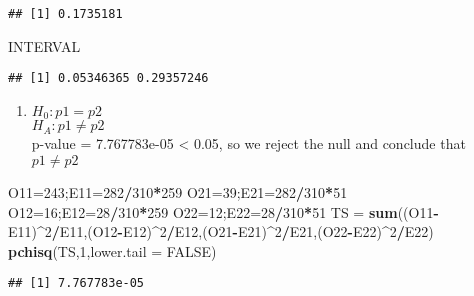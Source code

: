 \documentclass[]{article}
\newenvironment{Shaded}{\begin{snugshade}}{\end{snugshade}}
\newcommand{\KeywordTok}[1]{\textcolor[rgb]{0.13,0.29,0.53}{\textbf{#1}}}
\newcommand{\DataTypeTok}[1]{\textcolor[rgb]{0.13,0.29,0.53}{#1}}
\newcommand{\DecValTok}[1]{\textcolor[rgb]{0.00,0.00,0.81}{#1}}
\newcommand{\StringTok}[1]{\textcolor[rgb]{0.31,0.60,0.02}{#1}}
\newcommand{\OtherTok}[1]{\textcolor[rgb]{0.56,0.35,0.01}{#1}}
\newcommand{\OperatorTok}[1]{\textcolor[rgb]{0.81,0.36,0.00}{\textbf{#1}}}
\newcommand{\NormalTok}[1]{#1}
\providecommand{\tightlist}{%
  \setlength{\itemsep}{0pt}\setlength{\parskip}{0pt}}
\begin{document}
\begin{verbatim}
## [1] 0.1735181
\end{verbatim}

\begin{Shaded}
\begin{Highlighting}[]
\NormalTok{INTERVAL}
\end{Highlighting}
\end{Shaded}

\begin{verbatim}
## [1] 0.05346365 0.29357246
\end{verbatim}

\begin{enumerate}
\def\labelenumi{\alph{enumi}.}
\setcounter{enumi}{3}
\tightlist
\item
  \(H_0 : p1 = p2\)\\
  \(H_A : p1\neq p2\)\\
  p-value = 7.767783e-05 \textless{} 0.05, so we reject the null and
  conclude that \(p1\neq p2\)
\end{enumerate}

\begin{Shaded}
\begin{Highlighting}[]
\NormalTok{O11=}\DecValTok{243}\NormalTok{;E11=}\DecValTok{282}\OperatorTok{/}\DecValTok{310}\OperatorTok{*}\DecValTok{259}
\NormalTok{O21=}\DecValTok{39}\NormalTok{;E21=}\DecValTok{282}\OperatorTok{/}\DecValTok{310}\OperatorTok{*}\DecValTok{51}
\NormalTok{O12=}\DecValTok{16}\NormalTok{;E12=}\DecValTok{28}\OperatorTok{/}\DecValTok{310}\OperatorTok{*}\DecValTok{259}
\NormalTok{O22=}\DecValTok{12}\NormalTok{;E22=}\DecValTok{28}\OperatorTok{/}\DecValTok{310}\OperatorTok{*}\DecValTok{51}
\NormalTok{TS =}\StringTok{ }\KeywordTok{sum}\NormalTok{((O11}\OperatorTok{-}\NormalTok{E11)}\OperatorTok{^}\DecValTok{2}\OperatorTok{/}\NormalTok{E11,(O12}\OperatorTok{-}\NormalTok{E12)}\OperatorTok{^}\DecValTok{2}\OperatorTok{/}\NormalTok{E12,(O21}\OperatorTok{-}\NormalTok{E21)}\OperatorTok{^}\DecValTok{2}\OperatorTok{/}\NormalTok{E21,(O22}\OperatorTok{-}\NormalTok{E22)}\OperatorTok{^}\DecValTok{2}\OperatorTok{/}\NormalTok{E22)}
\KeywordTok{pchisq}\NormalTok{(TS,}\DecValTok{1}\NormalTok{,}\DataTypeTok{lower.tail =} \OtherTok{FALSE}\NormalTok{)}
\end{Highlighting}
\end{Shaded}

\begin{verbatim}
## [1] 7.767783e-05
\end{verbatim}
\end{document}
